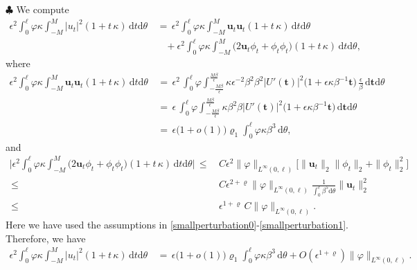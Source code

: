 \documentclass[10pt, reqno]{amsart}
\numberwithin{equation}{section}
\theoremstyle{definition}
\begin{document}
{{\medskip
\noindent$\clubsuit$
 We compute
\begin{align*}
 \epsilon^2\int_0^\ell \varphi \kappa\int_{-M}^{M} |u_t|^2 (1+t\,\kappa)\,{\mathrm d}t{\mathrm d}\theta
 &\,=\,\epsilon^2\int_0^\ell \varphi \kappa\int_{-M}^{M} {\mathbf u}_t{\mathbf u}_t (1+t\,\kappa)\,{\mathrm d}t{\mathrm d}\theta
\nonumber\\[2mm]
 &\quad+\epsilon^2\int_0^\ell \varphi \kappa\int_{-M}^{M} \big(2{\mathbf u}_t\phi_t+\phi_t\phi_t\big) (1+t\,\kappa)\,{\mathrm d}t{\mathrm d}\theta,
\end{align*}
 where
\begin{align*}
 \epsilon^2\int_0^\ell \varphi \kappa\int_{-M}^{M} {\mathbf u}_t{\mathbf u}_t (1+t\,\kappa)\,{\mathrm d}t{\mathrm d}\theta
 &\,=\,
 \epsilon^2\,\int_0^\ell \varphi \displaystyle\int_{-\frac{M\beta}{\epsilon}}^{\frac{M\beta}{\epsilon}}
 \kappa \epsilon^{-2}\beta^2\beta^2 \left|U'({\mathbf t})\right|^2\big(1+\epsilon \kappa \beta^{-1}{\mathbf t}\big)
 \,\frac{\epsilon}{\beta} \,{\mathrm d}{\mathbf t}{\mathrm d}\theta
\nonumber\\[2mm]
 &\,=\,\epsilon\,\int_0^\ell \varphi \displaystyle\int_{-\frac{M\beta}{\epsilon}}^{\frac{M\beta}{\epsilon}}
 \kappa \beta^2 \beta \left|U'({\mathbf t})\right|^2\big(1+\epsilon \kappa \beta^{-1}{\mathbf t}\big)
 \,{\mathrm d}{\mathbf t}{\mathrm d}\theta
\nonumber\\[2mm]
 &\,=\,\epsilon\big(1+o(1)\big)\varrho_1\int_0^\ell \varphi \kappa\beta^3\,{\mathrm d}\theta,
\end{align*}
 and
\begin{align*}
 \Bigg|\epsilon^2\int_0^\ell \varphi \kappa\int_{-M}^{M} \big(2{\mathbf u}_t\phi_t+\phi_t\phi_t\big) (1+t\,\kappa)\,{\mathrm d}t{\mathrm d}\theta\Bigg|
 \,\leq\,
 &C\epsilon^2\|\varphi\|_{L^\infty(0,\ell)}
 \Big[\|{\mathbf u}_t\|_2\|\phi_t\|_2+\|\phi_t\|_2^2\Big]
\nonumber\\[2mm]
 \,\leq\,
 &C\epsilon^{2+\varrho}\|\varphi\|_{L^\infty(0,\ell)}\frac{1}{\displaystyle\int_0^{\ell}\beta^5 {\mathrm d}\theta} \|{\mathbf u}_t\|_2^2
\nonumber\\[2mm]
 \,\leq\,
 &\epsilon^{1+\varrho}\, C \|\varphi\|_{L^\infty(0,\ell)}.
\end{align*}
Here we have used the assumptions in \eqref{smallperturbation0}-\eqref{smallperturbation1}.
Therefore, we have
\begin{align}\label{inedtitiesterm7}
 \epsilon^2\int_0^\ell \varphi \kappa\int_{-M}^{M} |u_t|^2 (1+t\,\kappa)\,{\mathrm d}t{\mathrm d}\theta
 &\,=\,\epsilon\big(1+o(1)\big)\varrho_1\int_0^\ell \varphi \kappa\beta^3\,{\mathrm d}\theta
 + O( \epsilon^{1+\varrho}) \|\varphi\|_{L^\infty(0,\ell)}.
\end{align}



}}
\end{document}
